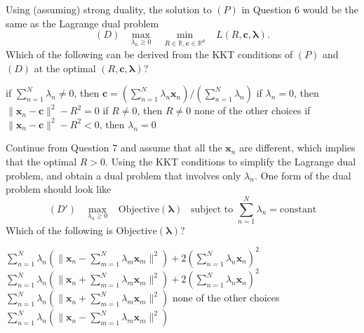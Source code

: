 \documentclass[a4paper,10pt]{exam}
\begin{document}
\begin{questions}
	\question Using (assuming) strong duality, the solution to $(P)$ in Question 6 would be the same as the Lagrange dual problem
	\[(D) \; \; \; \max_{\lambda_n \ge 0} \;\;\; \min_{R \in \mathbb{R}, \mathbf{c} \in \mathbb{R}^d}  \;\;\;  L(R, \mathbf{c}, {\boldsymbol\lambda}).\]
	Which of the following can be derived from the KKT conditions of $(P)$ and $(D)$ at the optimal $(R, \mathbf{c}, {\boldsymbol\lambda})$?
	\begin{choices}
		\CorrectChoice if $\sum_{n=1}^N \lambda_n \neq 0$, then $\mathbf{c} = \left(\sum_{n=1}^N \lambda_n \mathbf{x}_n\right) \Big/ \left(\sum_{n=1}^N \lambda_n\right)$
		\choice if $\lambda_n = 0$, then $\|\mathbf{x}_n - \mathbf{c}\|^2 - R^2 = 0$
		\CorrectChoice if $R \neq 0$, then $R \neq 0$
		\choice none of the other choices
		\choice if $\|\mathbf{x}_n - \mathbf{c}\|^2 - R^2 < 0$, then $\lambda_n = 0$\\
   \end{choices}
   
   \question Continue from Question 7 and assume that all the $\mathbf{x}_n$ are different, which implies that the optimal $R>0$. Using the KKT conditions to simplify the Lagrange dual problem, and obtain a dual problem that involves only $\lambda_n$. One form of the dual problem should look like
   \[(D') \; \; \; \max_{\lambda_n \ge 0} \; \; \; \mbox{Objective}(\boldsymbol\lambda) \; \; \; \mbox{subject to } \sum_{n=1}^N \lambda_n = \mbox{constant}\]
   Which of the following is $\mbox{Objective}(\boldsymbol\lambda)$?
   
   \begin{choices}
   	 \choice $\sum_{n=1}^N \lambda_n (\|\mathbf{x}_n - \sum_{m=1}^N \lambda_m \mathbf{x}_m \|^2) + 2(\sum_{n=1}^N \lambda_n \mathbf{x}_n)^2$
   	 \choice $\sum_{n=1}^N \lambda_n (\|\mathbf{x}_n + \sum_{m=1}^N \lambda_m \mathbf{x}_m \|^2) + 2(\sum_{n=1}^N \lambda_n \mathbf{x}_n)^2$
   	 \choice $\sum_{n=1}^N \lambda_n (\|\mathbf{x}_n + \sum_{m=1}^N \lambda_m \mathbf{x}_m \|^2)$
   	 \choice none of the other choices
   	 \CorrectChoice $\sum_{n=1}^N \lambda_n (\|\mathbf{x}_n - \sum_{m=1}^N \lambda_m \mathbf{x}_m \|^2)$\\
   \end{choices}
   

\end{questions}
\end{document}
